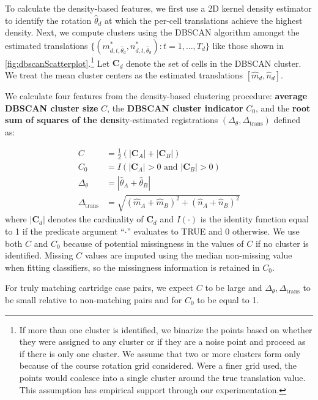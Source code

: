 \documentclass[reprint]{JASA}
\begin{document}
To calculate the density-based features, we first use a 2D kernel
density estimator \citep{MASS} to identify the rotation
\(\hat{\theta}_d\) at which the per-cell translations achieve the
highest density. Next, we compute clusters using the DBSCAN algorithm
amongst the estimated translations
\(\{(m^*_{d,t,\hat{\theta}_d},n^*_{d,t,\hat{\theta}_d}) : t = 1,...,T_d\}\)
like those shown in \autoref{fig:dbscanScatterplot}.\footnote{If more
  than one cluster is identified, we binarize the points based on
  whether they were assigned to any cluster or if they are a noise point
  and proceed as if there is only one cluster. We assume that two or
  more clusters form only because of the course rotation grid
  considered. Were a finer grid used, the points would coalesce into a
  single cluster around the true translation value. This assumption has
  empirical support through our experimentation.} Let \(\pmb{C}_d\)
denote the set of cells in the DBSCAN cluster. We treat the mean cluster
centers as the estimated translations \([\hat{m}_d,\hat{n}_d]\).

We calculate four features from the density-based clustering procedure:
\textbf{average DBSCAN cluster size} \(C\), the \textbf{DBSCAN cluster
indicator} \(C_0\), and the \textbf{root sum of squares of the
dens}ity-estimated registrations
\((\Delta_\theta, \Delta_{\text{trans}})\) defined as:

\begin{align*}
C &= \frac{1}{2}\left(|\pmb{C}_A| + |\pmb{C}_B|\right) \\
C_0 &= I(|\pmb{C}_A| > 0 \text{ and } |\pmb{C}_B| > 0)\\
\Delta_\theta &= |\hat{\theta}_A + \hat{\theta}_B| \\
\Delta_{\text{trans}} &= \sqrt{(\hat{m}_A + \hat{m}_B)^2 + (\hat{n}_A + \hat{n}_B)^2}
\end{align*} where \(|\pmb{C}_d|\) denotes the cardinality of
\(\pmb{C}_d\) and \(I(\cdot)\) is the identity function equal to 1 if
the predicate argument ``\(\cdot\)'' evaluates to TRUE and 0 otherwise.
We use both \(C\) and \(C_0\) because of potential missingness in the
values of \(C\) if no cluster is identified. Missing \(C\) values are
imputed using the median non-missing value when fitting classifiers, so
the missingness information is retained in \(C_0\).

For truly matching cartridge case pairs, we expect \(C\) to be large and
\(\Delta_\theta, \Delta_{\text{trans}}\) to be small relative to
non-matching pairs and for \(C_0\) to be equal to 1.
\end{document}
